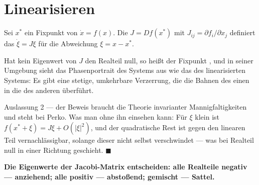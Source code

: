 \section{Linearisieren}

\begin{definition}
Sei $x^{*}$ ein Fixpunkt von $\dot x = f(x)$. Die  $J = Df(x^{*})$ mit $J_{ij} = \partial f_i/\partial x_j$ definiert das  $\dot\xi = J\xi$ für die Abweichung $\xi = x - x^{*}$.
\end{definition}

\begin{merksatz}
Hat kein Eigenwert von $J$ den Realteil null, so heißt der Fixpunkt , und in seiner Umgebung sieht das Phasenportrait des Systems aus wie das des linearisierten Systems: Es gibt eine stetige, umkehrbare Verzerrung, die die Bahnen des einen in die des anderen überführt.

Auslassung 2 --- der Beweis braucht die Theorie invarianter Mannigfaltigkeiten und steht bei Perko. Was man ohne ihn einsehen kann: Für $\xi$ klein ist $f(x^{*}+\xi) = J\xi + O(|\xi|^{2})$, und der quadratische Rest ist gegen den linearen Teil vernachlässigbar, solange dieser nicht selbst verschwindet --- was bei Realteil null in einer Richtung geschieht. $\blacksquare$

\begin{center}
\begin{minipage}{0.9\textwidth}
\textbf{Die Eigenwerte der Jacobi-Matrix entscheiden: alle Realteile negativ --- anziehend; alle positiv --- abstoßend; gemischt --- Sattel.}
\end{minipage}
\end{center}
\end{merksatz}


